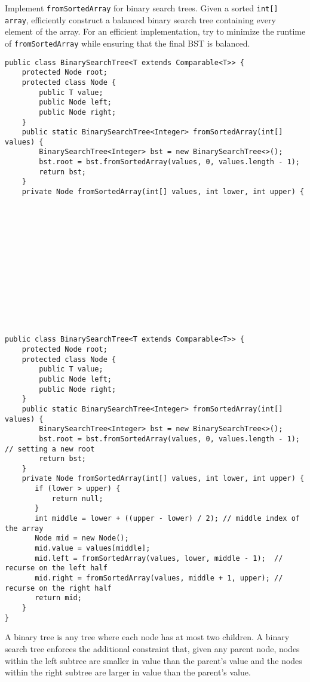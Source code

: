 \begin{blocksection}
\question Implement \lstinline$fromSortedArray$ for binary search trees. Given
a sorted \lstinline$int[] array$, efficiently construct a balanced binary
search tree containing every element of the array. For an efficient implementation,
try to minimize the runtime of \lstinline$fromSortedArray$ while ensuring
that the final BST is balanced.

\ifprintanswers
\else
\begin{lstlisting}
public class BinarySearchTree<T extends Comparable<T>> {
    protected Node root;
    protected class Node {
        public T value;
        public Node left;
        public Node right;
    }
    public static BinarySearchTree<Integer> fromSortedArray(int[] values) {
        BinarySearchTree<Integer> bst = new BinarySearchTree<>();
        bst.root = bst.fromSortedArray(values, 0, values.length - 1);
        return bst;
    }
    private Node fromSortedArray(int[] values, int lower, int upper) {














\end{lstlisting}
\fi

\begin{solution}
\begin{lstlisting}
public class BinarySearchTree<T extends Comparable<T>> {
    protected Node root;
    protected class Node {
        public T value;
        public Node left;
        public Node right;
    }
    public static BinarySearchTree<Integer> fromSortedArray(int[] values) {
        BinarySearchTree<Integer> bst = new BinarySearchTree<>();
        bst.root = bst.fromSortedArray(values, 0, values.length - 1); // setting a new root
        return bst;
    }
    private Node fromSortedArray(int[] values, int lower, int upper) {
       if (lower > upper) {
           return null;
       }
       int middle = lower + ((upper - lower) / 2); // middle index of the array
       Node mid = new Node();
       mid.value = values[middle];
       mid.left = fromSortedArray(values, lower, middle - 1);  // recurse on the left half
       mid.right = fromSortedArray(values, middle + 1, upper); // recurse on the right half
       return mid;
    }
}
\end{lstlisting}

A binary tree is any tree where each node has at most two children.
A binary search tree enforces the additional constraint
that, given any parent node, nodes within the left subtree are smaller in value than the parent's value and the
nodes within the right subtree are larger in value than the parent's value.


\end{solution}
\end{blocksection}
